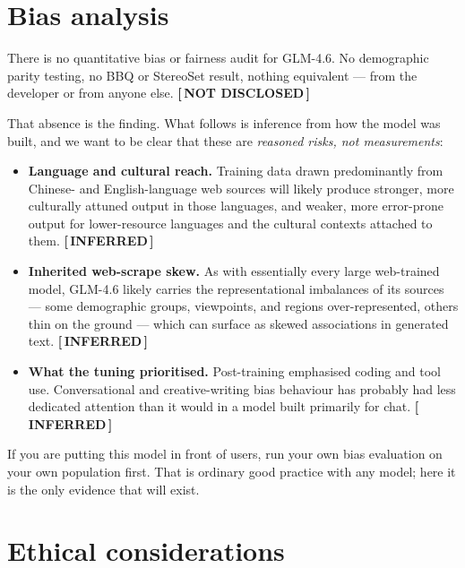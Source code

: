 \documentclass[11pt,a4paper]{article}
\newcommand{\tg}[2]{{\scriptsize\sffamily\bfseries\color{#1}[\,#2\,]}}
\newcommand{\Infr}{\tg{clay}{INFERRED}}
\newcommand{\Undi}{\tg{stone}{NOT DISCLOSED}}
\begin{document}
\section{Bias analysis}

There is no quantitative bias or fairness audit for GLM-4.6. No demographic parity testing, no
BBQ or StereoSet result, nothing equivalent --- from the developer or from anyone else. \Undi

That absence is the finding. What follows is inference from how the model was built, and we want
to be clear that these are \emph{reasoned risks, not measurements}:

\begin{itemize}
  \item \textbf{Language and cultural reach.} Training data drawn predominantly from Chinese- and
        English-language web sources will likely produce stronger, more culturally attuned output
        in those languages, and weaker, more error-prone output for lower-resource languages and
        the cultural contexts attached to them. \Infr
  \item \textbf{Inherited web-scrape skew.} As with essentially every large web-trained model,
        GLM-4.6 likely carries the representational imbalances of its sources --- some demographic
        groups, viewpoints, and regions over-represented, others thin on the ground --- which can
        surface as skewed associations in generated text. \Infr
  \item \textbf{What the tuning prioritised.} Post-training emphasised coding and tool use.
        Conversational and creative-writing bias behaviour has probably had less dedicated
        attention than it would in a model built primarily for chat. \Infr
\end{itemize}

\begin{aside}
If you are putting this model in front of users, run your own bias evaluation on your own
population first. That is ordinary good practice with any model; here it is the only evidence
that will exist.
\end{aside}

\section{Ethical considerations}
\end{document}
